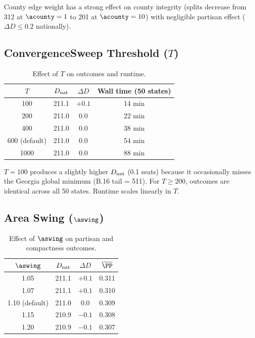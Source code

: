 County edge weight has a strong effect on county integrity (splits decrease
from 312 at $\acounty = 1$ to 201 at $\acounty = 10$) with negligible
partisan effect ($\Delta D \leq 0.2$ nationally).

\subsection{ConvergenceSweep Threshold ($T$)}

\begin{table}[h]
\centering
\caption{Effect of $T$ on outcomes and runtime.}
\label{tab:T-results}
\begin{tabular}{cccc}
\toprule
$T$ & $D_{\rm nat}$ & $\Delta D$ & Wall time (50 states) \\
\midrule
100  & 211.1 & $+0.1$ & 14 min \\
200  & 211.0 & 0.0    & 22 min \\
400  & 211.0 & 0.0    & 38 min \\
600 (default) & 211.0 & 0.0 & 54 min \\
1000 & 211.0 & 0.0    & 88 min \\
\bottomrule
\end{tabular}
\end{table}

$T = 100$ produces a slightly higher $D_{\rm nat}$ (0.1 seats) because
it occasionally misses the Georgia global minimum (B.16 tail = 511).
For $T \geq 200$, outcomes are identical across all 50 states.
Runtime scales linearly in $T$.

\subsection{Area Swing ($\aswing$)}

\begin{table}[h]
\centering
\caption{Effect of $\aswing$ on partisan and compactness outcomes.}
\label{tab:aswing-results}
\begin{tabular}{cccc}
\toprule
$\aswing$ & $D_{\rm nat}$ & $\Delta D$ & $\overline{\PP}$ \\
\midrule
1.05 & 211.1 & $+0.1$ & 0.311 \\
1.07 & 211.1 & $+0.1$ & 0.310 \\
1.10 (default) & 211.0 & 0.0 & 0.309 \\
1.15 & 210.9 & $-0.1$ & 0.308 \\
1.20 & 210.9 & $-0.1$ & 0.307 \\
\bottomrule
\end{tabular}
\end{table}

